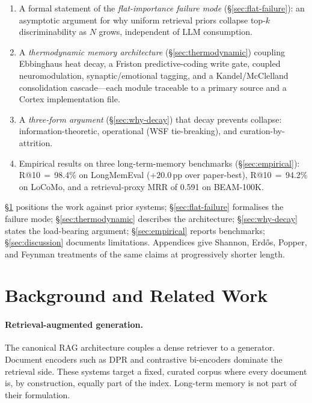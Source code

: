 \documentclass[11pt]{article}
\begin{document}
\begin{enumerate}
  \item A formal statement of the \emph{flat-importance failure
        mode} (\S\ref{sec:flat-failure}): an asymptotic argument
        for why uniform retrieval priors collapse top-$k$
        discriminability as $N$ grows, independent of LLM
        consumption.
  \item A \emph{thermodynamic memory architecture}
        (\S\ref{sec:thermodynamic}) coupling Ebbinghaus heat decay,
        a Friston predictive-coding write gate, coupled
        neuromodulation, synaptic/emotional tagging, and a
        Kandel/McClelland consolidation cascade---each module
        traceable to a primary source and a Cortex implementation
        file.
  \item A \emph{three-form argument} (\S\ref{sec:why-decay}) that
        decay prevents collapse: information-theoretic, operational
        (WSF tie-breaking), and curation-by-attrition.
  \item Empirical results on three long-term-memory benchmarks
        (\S\ref{sec:empirical}): R@10\,$=$\,98.4\% on LongMemEval
        ($+20.0$\,pp over paper-best), R@10\,$=$\,94.2\% on LoCoMo,
        and a retrieval-proxy MRR of 0.591 on BEAM-100K.
\end{enumerate}

\S\ref{sec:related} positions the work against prior systems;
\S\ref{sec:flat-failure} formalises the failure mode;
\S\ref{sec:thermodynamic} describes the architecture;
\S\ref{sec:why-decay} states the load-bearing argument;
\S\ref{sec:empirical} reports benchmarks;
\S\ref{sec:discussion} documents limitations.  Appendices give
Shannon, Erd\H{o}s, Popper, and Feynman treatments of the same
claims at progressively shorter length.

\section{Background and Related Work}
\label{sec:related}

\paragraph{Retrieval-augmented generation.}
The canonical RAG architecture \citep{Lewis2020} couples a dense
retriever to a generator.  Document encoders such as DPR
\citep{Karpukhin2020} and contrastive bi-encoders dominate the
retrieval side.  These systems target a fixed, curated corpus where
every document is, by construction, equally part of the index.
Long-term memory is not part of their formulation.
\end{document}
